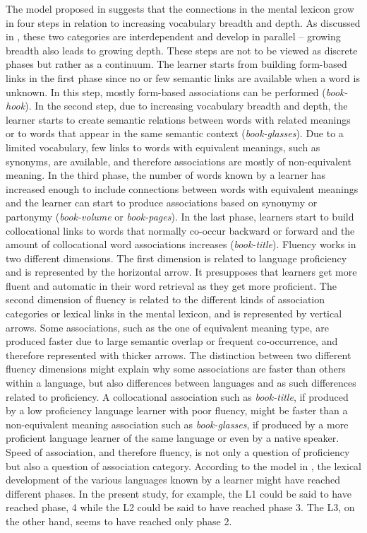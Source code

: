 \documentclass[output=paper,colorlinks,citecolor=brown,nonflat]{langsci/langscibook}
\begin{document}
The model proposed in  suggests that the connections in the mental lexicon grow in four steps in relation to increasing vocabulary breadth and depth. As discussed in , these two categories are interdependent and develop in parallel – growing breadth also leads to growing depth. These steps are not to be viewed as discrete phases but rather as a continuum. The learner starts from building form-based links in the first phase since no or few semantic links are available when a word is unknown. In this step, mostly form-based associations can be performed (\textit{book-hook}). In the second step, due to increasing vocabulary breadth and depth, the learner starts to create semantic relations between words with related meanings or to words that appear in the same semantic context (\textit{book-glasses}). Due to a limited vocabulary, few links to words with equivalent meanings, such as synonyms, are available, and therefore associations are mostly of non-equivalent meaning. In the third phase, the number of words known by a learner has increased enough to include connections between words with equivalent meanings and the learner can start to produce associations based on synonymy or partonymy (\textit{book-volume} or \textit{book-pages}). In the last phase, learners start to build collocational links to words that normally co-occur backward or forward and the amount of collocational word associations increases (\textit{book-title}). Fluency works in two different dimensions. The first dimension is related to language proficiency and is represented by the horizontal arrow. It presupposes that learners get more fluent and automatic in their word retrieval as they get more proficient. The second dimension of fluency is related to the different kinds of association categories or lexical links in the mental lexicon, and is represented by vertical arrows. Some associations, such as the one of equivalent meaning type, are produced faster due to large semantic overlap or frequent co-occurrence, and therefore represented with thicker arrows. The distinction between two different fluency dimensions might explain why some associations are faster than others within a language, but also differences between languages and as such differences related to proficiency. A collocational association such as \textit{book-title}, if produced by a low proficiency language learner with poor fluency, might be faster than a non-equivalent meaning association such as \textit{book-glasses}, if produced by a more proficient language learner of the same language or even by a native speaker. Speed of association, and therefore fluency, is not only a question of proficiency but also a question of association category. According to the model in , the lexical development of the various languages known by a learner might have reached different phases. In the present study, for example, the L1 could be said to have reached phase, 4 while the L2 could be said to have reached phase 3. The L3, on the other hand, seems to have reached only phase 2.
\end{document}
